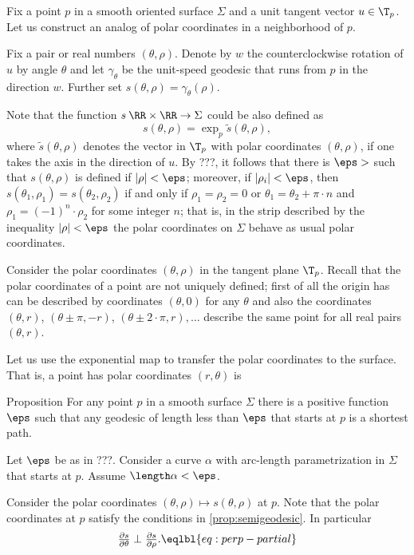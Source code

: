Fix a point $p$ in a smooth oriented surface $\Sigma$ and a unit tangent vector $u\in\T_p$.
Let us construct an analog of polar coordinates in a neighborhood of $p$.

Fix a pair or real numbers $(\theta,\rho)$.
Denote by $w$ the counterclockwise rotation of $u$ by angle $\theta$ and let $\gamma_\theta$ be the unit-speed geodesic that runs from $p$ in the direction $w$.
Further set $s(\theta,\rho)=\gamma_\theta(\rho)$.

Note that the function $s\:\RR\times \RR\to \Sigma$ could be also defined as 
\[s(\theta,\rho)=\exp_p\tilde s(\theta,\rho),\]
where $\tilde s(\theta,\rho)$ denotes the vector in $\T_p$ with polar coordinates $(\theta,\rho)$, if one takes the axis in the direction of $u$.
By ???, it follows that there is $\eps>$ such that $s(\theta,\rho)$ is defined if $|\rho|<\eps$;
moreover, if $|\rho_i|<\eps$, then $s(\theta_1,\rho_1)=s(\theta_2,\rho_2)$ if and only if $\rho_1=\rho_2=0$ or $\theta_1=\theta_2+\pi\cdot n$ and $\rho_1=(-1)^n\cdot \rho_2$ for some integer $n$;
that is, in the strip described by the inequality $|\rho|<\eps$ the polar coordinates on $\Sigma$ behave as usual polar coordinates.

Consider the polar coordinates $(\theta,\rho)$ in the tangent plane $\T_p$.
Recall that the polar coordinates of a point are not uniquely defined;
first of all the origin has can be described by coordinates $(\theta,0)$ for any $\theta$ and also 
the coordinates $(\theta,r)$, $(\theta\pm\pi,-r)$, $(\theta\pm2\cdot \pi,r),\dots$ describe the same point for all real pairs $(\theta,r)$.

Let us use the exponential map to transfer the polar coordinates to the surface.
That is, a point has polar coordinates $(r,\theta)$ is 

\begin{thm}{Proposition}
For any point $p$ in a smooth surface $\Sigma$ there is a positive function $\eps$
such that any geodesic of length less than $\eps$ that starts at $p$ is a shortest path.  
\end{thm}

 Let $\eps$ be as in ???.
Consider a curve $\alpha$ with arc-length parametrization in $\Sigma$ that starts at $p$.
Assume $\length\alpha<\eps$.

Consider the polar coordinates $(\theta,\rho)\mapsto s(\theta,\rho)$ at $p$.
Note that the polar coordinates at $p$ satisfy the conditions in \ref{prop:semigeodesic}.
In particular
\[\tfrac{\partial s}{\partial\theta}\perp\tfrac{\partial s}{\partial\rho}.\eqlbl{eq:perp-partial}\]

